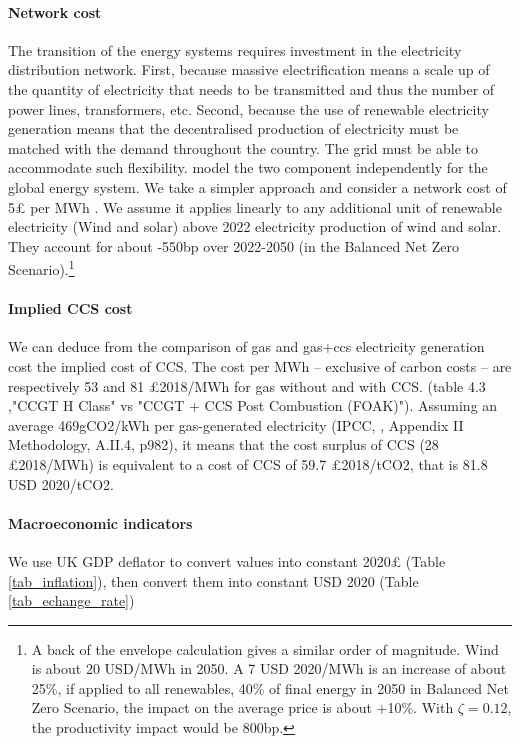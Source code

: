 \paragraph{Network cost} The transition of the energy systems requires investment in the electricity distribution network. First, because massive electrification means a scale up of the quantity of electricity that needs to be transmitted and thus the number of power lines, transformers, etc. Second, because the use of renewable electricity generation means that the decentralised production of electricity must be matched with the demand throughout the country. The grid must be able to accommodate such flexibility. \cite{wayEmpiricallyGroundedTechnology2022} model the two component independently for the global energy system. We take a simpler approach and consider a network cost of 5£ per MWh \citep{carbonbriefIndepthWholeSystem2017}. We assume it applies linearly to any additional unit of renewable electricity (Wind and solar) above 2022 electricity production of wind and solar. They account for about -550bp over 2022-2050 (in the Balanced Net Zero Scenario).\footnote{
%
A back of the envelope calculation gives a similar order of magnitude. Wind is about 20 USD/MWh in 2050. A 7 USD 2020/MWh is an increase of about 25\%, if applied to all renewables, 40\% of final energy in 2050 in Balanced Net Zero Scenario, the impact on the average price is about +10\%. With $\zeta=0.12$, the productivity impact would be 800bp.
%
} 
 
\begin{landscape}

\end{landscape}

\paragraph{Implied CCS cost} We can deduce from the comparison of gas and gas+ccs electricity generation cost the implied cost of CCS. The cost per MWh -- exclusive of carbon costs -- are respectively 53 and 81 £2018/MWh for gas without and with CCS. (table 4.3 \cite{beisElectricityGenerationCost2020},"CCGT H
Class"	vs "CCGT + CCS Post Combustion (FOAK)"). Assuming an average 469gCO2/kWh per gas-generated electricity (IPCC, \cite{edenhoferSpecialReportRenewable2011}, Appendix II Methodology, A.II.4, p982), it means that the cost surplus of CCS (28 £2018/MWh) is equivalent to a cost of CCS of 59.7 £2018/tCO2, that is 81.8 USD 2020/tCO2. 


\paragraph{Macroeconomic indicators} We use UK GDP deflator to convert values into constant 2020£ (Table \ref{tab_inflation}), then convert them into constant USD 2020 (Table \ref{tab_echange_rate})

